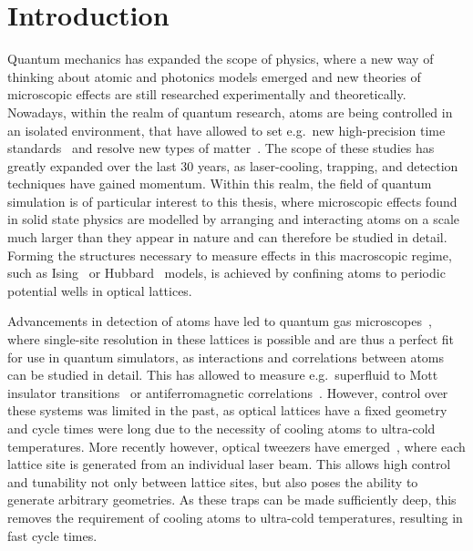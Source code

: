 \chapter{Introduction}

\newcommand{\docite}{\textcolor{red}{~█}}

Quantum mechanics has expanded the scope of physics, where a new way of thinking about atomic and photonics models emerged and new theories of microscopic effects are still researched experimentally and theoretically.
Nowadays, within the realm of quantum research, atoms are being controlled in an isolated environment, that have allowed to set e.g.\ new high-precision time standards~\cite{Brewer2019} and resolve new types of matter~\cite{Anderson1995, Davis1995}. The scope of these studies has greatly expanded over the last 30 years, as laser-cooling, trapping, and detection techniques have gained momentum. Within this realm, the field of quantum simulation is of particular interest to this thesis, where microscopic effects found in solid state physics are modelled by arranging and interacting atoms on a scale much larger than they appear in nature and can therefore be studied in detail. Forming the structures necessary to measure effects in this macroscopic regime, such as Ising~\cite{Schauß2015} or Hubbard~\cite{Boll2016} models, is achieved by confining atoms to periodic potential wells in optical lattices.

Advancements in detection of atoms have led to quantum gas microscopes~\cite{Bakr2009, Sherson2010}, where single-site resolution in these lattices is possible and are thus a perfect fit for use in quantum simulators, as interactions and correlations between atoms can be studied in detail. This has allowed to measure e.g.\ superfluid to Mott insulator transitions~\cite{Sherson2010} or antiferromagnetic correlations~\cite{Boll2016}. However, control over these systems was limited in the past, as optical lattices have a fixed geometry and cycle times were long due to the necessity of cooling atoms to ultra-cold temperatures. More recently however, optical tweezers have emerged~\cite{Lee2016, Barredo2016, Endres2016, Norcia2018}, where each lattice site is generated from an individual laser beam. This allows high control and tunability not only between lattice sites, but also poses the ability to generate arbitrary geometries. As these traps can be made sufficiently deep, this removes the requirement of cooling atoms to ultra-cold temperatures, resulting in fast cycle times.

